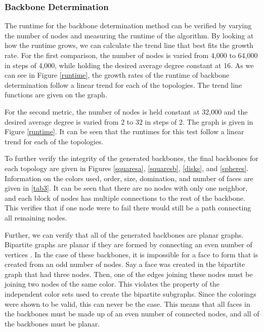 \documentclass{article}
\begin{document}
        \subsubsection{Backbone Determination}
        The runtime for the backbone determination method can be verified by varying the number of nodes and measuring the runtime of the algorithm. By looking at how the runtime grows, we can calculate the trend line that best fits the growth rate. For the first comparison, the number of nodes is varied from 4,000 to 64,000 in steps of 4,000, while holding the desired average degree constant at 16. As we can see in Figure \ref{runtime}, the growth rates of the runtime of backbone determination follow a linear trend for each of the topologies. The trend line functions are given on the graph.
        \par
        For the second metric, the number of nodes is held constant at 32,000 and the desired average degree is varied from 2 to 32 in steps of 2. The graph is given in Figure \ref{runtime}. It can be seen that the runtimes for this test follow a linear trend for each of the topologies.
        \par
        To further verify the integrity of the generated backbones, the final backbones for each topology are given in Figures \ref{squaresa}, \ref{squaresb}, \ref{disks}, and \ref{spheres}. Information on the colors used, order, size, domination, and number of faces are given in \ref{tab3}. It can be seen that there are no nodes with only one neighbor, and each block of nodes has multiple connections to the rest of the backbone. This verifies that if one node were to fail there would still be a path connecting all remaining nodes.
        \par
        Further, we can verify that all of the generated backbones are planar graphs. Bipartite graphs are planar if they are formed by connecting an even number of vertices \cite{planar}. In the case of these backbones, it is impossible for a face to form that is created from an odd number of nodes. Say a face was created in the bipartite graph that had three nodes. Then, one of the edges joining these nodes must be joining two nodes of the same color. This violates the property of the independent color sets used to create the bipartite subgraphs. Since the colorings were shown to be valid, this can never be the case. This means that all faces in the backbones must be made up of an even number of connected nodes, and all of the backbones must be planar.
\end{document}
